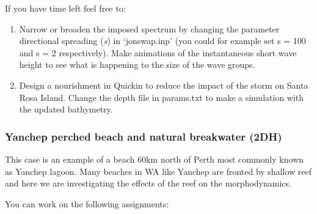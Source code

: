 \documentclass{article}
\begin{document}
\noindent 

\noindent If you have time left feel free to: 

\begin{enumerate}
\item  Narrow or broaden the imposed spectrum by changing the parameter directional spreading (\textit{s}) in `jonswap.inp' (you could for example set s = 100 and s = 2 respectively). Make animations of the instantaneous short wave height to see what is happening to the size of the wave groups.  

\item  Design a nourishment in Quickin to reduce the impact of the storm on Santa Rosa Island. Change the depth file in params.txt to make a simulation with the updated bathymetry.
\end{enumerate}


\subsubsection{ Yanchep perched beach and natural breakwater (2DH) }

\noindent This case is an example of a beach 60km north of Perth most commonly known as Yanchep lagoon. Many beaches in WA like Yanchep are fronted by shallow reef and here we are investigating the effects of the reef on the morphodynamics. 

\noindent 

\noindent You can work on the following assignments:

\noindent \textbf{}
\end{document}
